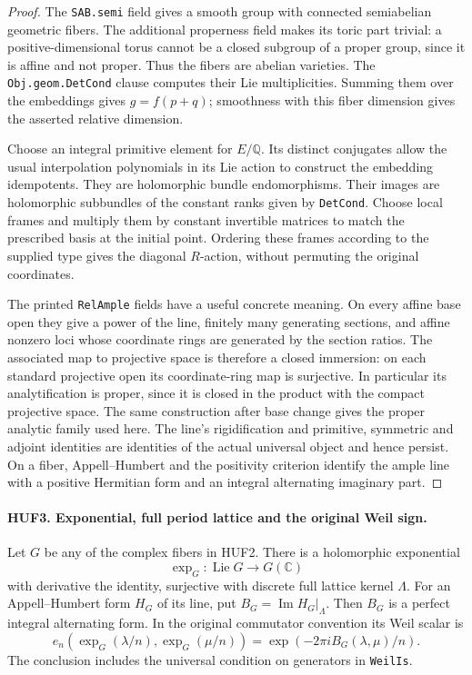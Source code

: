 \documentclass[11pt,a4paper]{article}
\numberwithin{equation}{section}
\theoremstyle{remark}\newtheorem{remark}[theorem]{Remark}
\begin{document}
\begin{proof}
The \texttt{SAB.\allowbreak semi} field gives a smooth group with connected
semiabelian geometric fibers.  The additional properness field
makes its toric part trivial: a positive-dimensional torus cannot
be a closed subgroup of a proper group, since it is affine and
not proper.  Thus the fibers are abelian varieties.  The
\texttt{Obj.\allowbreak geom.\allowbreak Det\allowbreak Cond} clause computes their Lie multiplicities.
Summing them over the embeddings gives \(g=f(p+q)\);
smoothness with this fiber dimension gives the asserted relative
dimension.

Choose an integral primitive element for \(E/\mathbb Q\).
Its distinct conjugates allow the usual interpolation polynomials
in its Lie action to construct the embedding idempotents.
They are holomorphic bundle endomorphisms.  Their images are
holomorphic subbundles of the constant ranks given by
\texttt{Det\allowbreak Cond}.  Choose local frames and multiply them by constant
invertible matrices to match the prescribed basis at the initial
point.  Ordering these frames according to the supplied type gives
the diagonal \(R\)-action, without permuting the original coordinates.

The printed \texttt{Rel\allowbreak Ample} fields have a useful concrete meaning.
On every affine base open they give a power of the line, finitely
many generating sections, and affine nonzero loci whose coordinate
rings are generated by the section ratios.  The associated map
to projective space is therefore a closed immersion: on each
standard projective open its coordinate-ring map is surjective.
In particular its analytification is proper, since it is closed
in the product with the compact projective space.  The same
construction after base change gives the proper analytic family
used here.  The line's rigidification and primitive, symmetric
and adjoint identities are identities of the actual universal
object and hence persist.  On a fiber, Appell--Humbert and the
positivity criterion identify the ample line with a positive
Hermitian form and an integral alternating imaginary part.
\end{proof}

\paragraph{HUF3. Exponential, full period lattice and the original Weil sign.}
\label{claim:HUF3}
Let \(G\) be any of the complex fibers in HUF2.
There is a holomorphic exponential
\[
       \exp_G:\operatorname{Lie}G\longrightarrow G(\mathbb C)
 \tag{HUF.3}
\]
with derivative the identity, surjective with discrete full
lattice kernel \(\Lambda\).  For an Appell--Humbert form
\(H_G\) of its line, put \(B_G=\operatorname{Im}H_G|_\Lambda\).
Then \(B_G\) is a perfect integral alternating form.  In the
original commutator convention its Weil scalar is
\[
 e_n(\exp_G(\lambda/n),\exp_G(\mu/n))
                     =\exp(-2\pi iB_G(\lambda,\mu)/n).
 \tag{HUF.4}
\]
The conclusion includes the universal condition on generators
in \texttt{Weil\allowbreak Is}.
\end{document}
